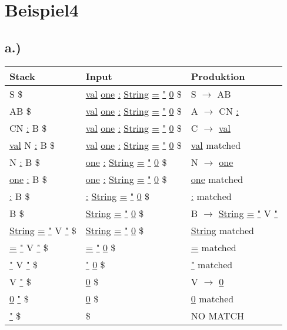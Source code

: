 \documentclass[12pt,runningheads,a4paper]{llncs}
\begin{document}
\section*{Beispiel4}
\subsection*{a.)}
\begin{table}[H]
    \centering
      \begin{tabular}{|m{2.5cm}|m{3.5cm}|m{3.5cm}|}
\hline
Stack & Input & Produktion \\ \hline
S \$& \underline{val} \underline{one} \underline{:}  \underline{String} \underline{=} \underline{"} \underline{0} \$& S $\rightarrow$ AB  \\ \hline
AB \$& \underline{val} \underline{one} \underline{:}  \underline{String} \underline{=} \underline{"} \underline{0} \$& A $\rightarrow$ CN \underline{:}\\ \hline
CN \underline{:} B \$& \underline{val} \underline{one} \underline{:}  \underline{String} \underline{=} \underline{"} \underline{0} \$& C $\rightarrow$ \underline{val} \\ \hline
\underline{val} N \underline{:} B \$& \underline{val} \underline{one} \underline{:}  \underline{String} \underline{=} \underline{"} \underline{0} \$& \underline{val} matched \\ \hline
N \underline{:} B \$& \underline{one} \underline{:}  \underline{String} \underline{=} \underline{"} \underline{0} \$& N $\rightarrow$ \underline{one}\\ \hline
\underline{one} \underline{:} B \$& \underline{one} \underline{:}  \underline{String} \underline{=} \underline{"} \underline{0} \$& \underline{one} matched\\ \hline
\underline{:} B \$& \underline{:}  \underline{String} \underline{=} \underline{"} \underline{0} \$& \underline{:} matched\\ \hline
 B \$& \underline{String} \underline{=} \underline{"} \underline{0} \$& B $\rightarrow$ \underline{String} \underline{=} \underline{"} V  \underline{"} \\ \hline
\underline{String} \underline{=} \underline{"} V  \underline{"} \$& \underline{String} \underline{=} \underline{"} \underline{0} \$& \underline{String} matched\\ \hline
\underline{=} \underline{"} V  \underline{"} \$&\underline{=} \underline{"} \underline{0} \$& \underline{=} matched\\ \hline
\underline{"} V  \underline{"} \$& \underline{"} \underline{0} \$& \underline{"} matched\\ \hline
V  \underline{"} \$& \underline{0} \$& V $\rightarrow$ \underline{0}\\ \hline
\underline{0}  \underline{"} \$& \underline{0} \$& \underline{0} matched\\ \hline
\underline{"} \$&\$ & NO MATCH\\
\hline
        \end{tabular}
\end{table}
\end{document}
